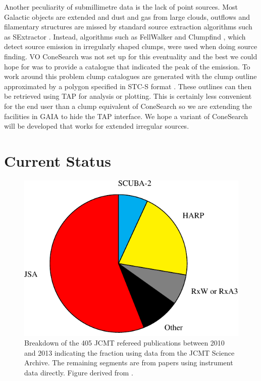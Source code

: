 \documentclass[final,authoryear,5p,times,twocolumn]{elsarticle}
\begin{document}
Another peculiarity of submillimetre data is the lack of point
sources. Most Galactic objects are extended and dust and gas from
large clouds, outflows and filamentary structures are missed by
standard source extraction algorithms such as SExtractor
\citep[][]{1996A&AS..117..393B}. Instead, algorithms
such as FellWalker \citep[][]{2015FW,2007ASPC..376..425B} and
Clumpfind \citep[][]{1994ApJ...428..693W}, which detect
source emission in irregularly shaped clumps, were used when
doing source finding. VO ConeSearch was not
set up for this eventuality and the best we could hope for was to
provide a catalogue that indicated the peak of the emission. To work
around this problem clump catalogues are generated with the clump
outline approximated by a polygon specified in STC-S format
\citep{2010ASPC..434..213B}. These outlines can then be retrieved
using TAP for analysis or plotting. This is certainly less convenient
for the end user than a clump equivalent of ConeSearch so we are
extending the facilities in GAIA
\citep[][]{2009ASPC..411..575D} to hide the TAP
interface. We hope a variant of ConeSearch will be developed that
works for extended irregular sources.

\section{Current Status}

\begin{figure}[t]
\includegraphics[width=\columnwidth]{jcmt-pubs-crop}
\caption{Breakdown of the 405 JCMT refereed publications between 2010 and
    2013 indicating the fraction using data from the JCMT Science
    Archive. The remaining segments are from papers using instrument
    data directly. Figure derived from \citet{2014SPIE9152-93}.}
\label{fig:jsapubs}
\end{figure}
\end{document}

